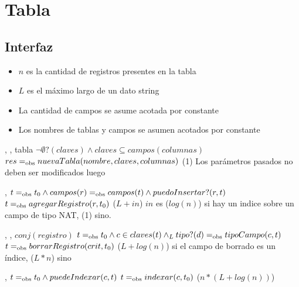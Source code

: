 \section{Tabla}

\subsection{Interfaz}

\iusa{}

\ioperaciones

\begin{itemize}
    \item{$n$ es la cantidad de registros presentes en la tabla}
    \item{$L$ es el máximo largo de un dato string}
    \item{La cantidad de campos se asume acotada por constante}
    \item{Los nombres de tablas y campos se asumen acotados por constante}
\end{itemize}

{   ,
    ,
    } %
{tabla} %
{$\neg\emptyset?(claves) \land claves \subseteq campos(columnas)$} %
{$res =_{\mathrm{obs}} nuevaTabla(nombre, claves, columnas)$} %
{\bigo(1)} %
{Los parámetros pasados no deben ser modificados luego} %
{} %

{   ,
    }
{}
{$t =_{\mathrm{obs}} t_0 \land campos(r) =_{\mathrm{obs}} campos(t) \land puedoInsertar?(r,t)$}
{$t =_{\mathrm{obs}} agregarRegistro(r,t_0)$}
{\bigo($L + in$)}
{}
{$in$ es \bigo($log(n)$) si hay un indice sobre un campo de tipo NAT, \bigo(1) sino. \\
 }

{   ,
    ,
    }
{$conj(registro)$}
{$t =_{\mathrm{obs}} t_0 \land c \in claves(t) \land_L tipo?(d) =_{\mathrm{obs}} tipoCampo(c,t)$}
{$t =_{\mathrm{obs}} borrarRegistro(crit,t_0)$}
{\bigo($L + log(n)$) si el campo de borrado es un índice, \bigo($L * n$) sino}
{}
{}

{   ,
    }
{}
{$t =_{\mathrm{obs}} t_0 \land puedeIndexar(c,t)$}
{$t =_{\mathrm{obs}} indexar(c,t_0)$}
{\bigo($n * (L + log(n))$)}
{}
{}

